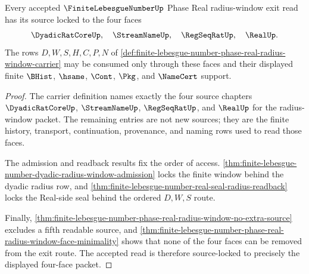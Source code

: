 \begin{theorem}
\label{thm:finite-lebesgue-number-phase-real-radius-window-source-lock}
Every accepted $\FiniteLebesgueNumberUp$ Phase Real radius-window exit read has its source locked to the four faces
$$
\DyadicRatCoreUp,\quad \StreamNameUp,\quad \RegSeqRatUp,\quad \RealUp.
$$
The rows $D,W,S,H,C,P,N$ of \autoref{def:finite-lebesgue-number-phase-real-radius-window-carrier} may be consumed only through these faces and their displayed finite $\BHist$, $\hsame$, $\Cont$, $\Pkg$, and $\NameCert$ support.
\end{theorem}
\begin{proof}
The carrier definition names exactly the four source chapters $\DyadicRatCoreUp$, $\StreamNameUp$, $\RegSeqRatUp$, and $\RealUp$ for the radius-window packet. The remaining entries are not new sources; they are the finite history, transport, continuation, provenance, and naming rows used to read those faces.

The admission and readback results fix the order of access. \autoref{thm:finite-lebesgue-number-dyadic-radius-window-admission} locks the finite window behind the dyadic radius row, and \autoref{thm:finite-lebesgue-number-real-seal-radius-readback} locks the Real-side seal behind the ordered $D,W,S$ route.

Finally, \autoref{thm:finite-lebesgue-number-phase-real-radius-window-no-extra-source} excludes a fifth readable source, and \autoref{thm:finite-lebesgue-number-phase-real-radius-window-face-minimality} shows that none of the four faces can be removed from the exit route. The accepted read is therefore source-locked to precisely the displayed four-face packet.
\end{proof}

